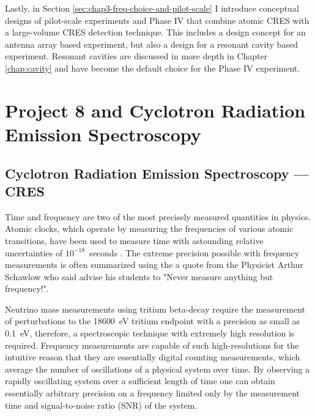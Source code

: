 Lastly, in Section \ref{sec:chap3-freq-choice-and-pilot-scale} I introduce conceptual designs of pilot-scale experiments and Phase IV that combine atomic CRES with a large-volume CRES detection technique. This includes a design concept for an antenna array based experiment, but also a design for a resonant cavity based experiment. Resonant cavities are discussed in more depth in Chapter \ref{chap:cavity} and have become the default choice for the Phase IV experiment.

\section{Project 8 and Cyclotron Radiation Emission Spectroscopy}
\label{sec:chap3-cres-and-p8}

\subsection{Cyclotron Radiation Emission Spectroscopy --- CRES}

Time and frequency are two of the most precisely measured quantities in physics. %
Atomic clocks, which operate by measuring the frequencies of various atomic transitions, have been used to measure time with astounding relative uncertainties of $10^{-18}$~seconds \cite{atomic_clock}. The extreme precision possible with frequency measurements is often summarized using the a quote from the Physicist Arthur Schawlow who said advise his students to "Never measure anything but frequency!"\cite{never_meas_anything_but_freq}. 

Neutrino mass measurements using tritium beta-decay require the measurement of perturbations to the 18600~eV tritium endpoint with a precision as small as 0.1~eV, therefore, a spectroscopic technique with extremely high resolution is required. Frequency measurements are capable of such high-resolutions for the intuitive reason that they are essentially digital counting measurements, which average the number of oscillations of a physical system over time. By observing a rapidly oscillating system over a sufficient length of time one can obtain essentially arbitrary precision on a frequency limited only by the measurement time and signal-to-noise ratio (SNR) of the system.

